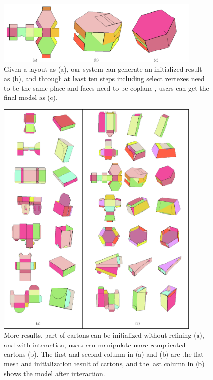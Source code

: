 \begin{figure}
	\centering
	\includegraphics[width=0.9\textwidth]{images/limitation.jpg}
	\caption{Given a layout as (a), our system can generate an initialized result as (b), and through at least ten steps including select vertexes need to be the same place and faces need to be coplane , users can get the final model as (c).}
	\label{fig:limitation}
\end{figure}



\begin{figure}
	\centering
	\includegraphics[width=0.9\textwidth]{images/more.jpg}
	\caption{More results, part of cartons can be initialized without refining (a), and with interaction, users can manipulate more complicated cartons (b). The first and second column in (a) and (b) are the flat mesh and initialization result of cartons, and the last column in (b) shows the model after interaction.}
	\label{fig:more}
\end{figure}